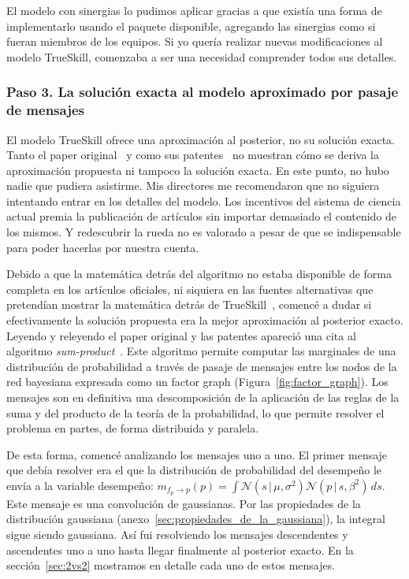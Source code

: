 \documentclass[a4paper,11pt]{book}
\newcommand{\N}{\mathcal{N}}
\theoremstyle{definition}
\begin{document}

El modelo con sinergias lo pudimos aplicar gracias a que exist\'ia una forma de implementarlo usando el paquete disponible, agregando las sinergias como si fueran miembros de los equipos.
%
Si yo quer\'ia realizar nuevas modificaciones al modelo TrueSkill, comenzaba a ser una necesidad comprender todos sus detalles.

\subsubsection{Paso 3. La soluci\'on exacta al modelo aproximado por pasaje de mensajes}

El modelo TrueSkill ofrece una aproximaci\'on al posterior, no su soluci\'on exacta.
%
Tanto el paper original~\cite{Herbrich2007} y como sus patentes~\cite{trueskill_patent_06, trueskill_patent_09} no muestran c\'omo se deriva la aproximaci\'on propuesta ni tampoco la soluci\'on exacta.
%
En este punto, no hubo nadie que pudiera asistirme.
%
Mis directores me recomendaron que no siguiera intentando entrar en los detalles del modelo.
%
Los incentivos del sistema de ciencia actual premia la publicaci\'on de art\'iculos sin importar demasiado el contenido de los mismos.
%
Y redescubrir la rueda no es valorado a pesar de que se indispensable para poder hacerlas por nuestra cuenta.


Debido a que la matem\'atica detr\'as del algoritmo no estaba disponible de forma completa en los art\'iculos oficiales, ni siquiera en las fuentes alternativas que pretend\'ian mostrar la matem\'atica detr\'as de TrueSkill~\cite{Mosser2011}, comenc\'e a dudar si efectivamente la soluci\'on propuesta era la mejor aproximaci\'on al posterior exacto.
%
Leyendo y releyendo el paper original y las patentes apareci\'o una cita al algoritmo \emph{sum-product}~\cite{Kschischang2001}.
%
Este algoritmo permite computar las marginales de una distribuci\'on de probabilidad a trav\'es de pasaje de mensajes entre los nodos de la red bayesiana expresada como un factor graph (Figura~\ref{fig:factor_graph}).
%
Los mensajes son en definitiva una descomposici\'on de la aplicaci\'on de las reglas de la suma y del producto de la teor\'ia de la probabilidad, lo que permite resolver el problema en partes, de forma distribuida y paralela.


De esta forma, comenc\'e analizando los mensajes uno a uno.
%
El primer mensaje que deb\'ia resolver era el que la distribuci\'on de probabilidad del desempe\~no le env\'ia a la variable desempe\~no:
$m_{f_p\rightarrow p}(p) = \int \N(s\,|\,\mu, \sigma^2) \N(p\,|\,s,\beta^2) \, ds$.
%
Este mensaje es una convoluci\'on de gaussianas.
%
Por las propiedades de la distribuci\'on gaussiana (anexo~\ref{sec:propiedades_de_la_gaussiana}), la integral sigue siendo gaussiana.
%
As\'i fui resolviendo los mensajes descendentes y ascendentes uno a uno hasta llegar finalmente al posterior exacto.
%
En la secci\'on~\ref{sec:2vs2} mostramos en detalle cada uno de estos mensajes.
\end{document}
